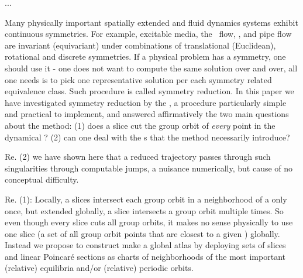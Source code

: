

\ifboyscout
	...
\fi

Many physically important spatially extended and fluid dynamics systems exhibit continuous
symmetries. For example,  excitable
media, the \KS\
flow, {\pCf}, and
pipe flow\rf{Wk04,Kerswell05} are invariant (equivariant) under
combinations of translational (Euclidean), rotational and
discrete symmetries.
If a physical problem has a symmetry, one should use it - one does not
want to compute the same solution over and over, all one needs is to
pick one representative solution per each symmetry related equivalence
class. Such procedure is called symmetry reduction.  In this
paper we have investigated symmetry reduction by the \mslices,
a procedure particularly simple and practical to implement, and
answered affirmatively the two main questions about the method:
(1) does a slice cut the group orbit of \emph{every} point in the dynamical \statesp?
(2) can one deal with the {\sset s} that the method necessarily
introduce?

Re. (2) we have shown here that a reduced trajectory
passes through such singularities through computable jumps,
a nuisance numerically, but cause of no conceptual difficulty.

Re. (1): Locally, a slices intersect each group orbit in a neighborhood of a
{\template} only once,
but extended globally, a slice intersects a group orbit multiple times.
So even though every slice cuts all group orbits, it makes no sense
physically to use one slice (a set of all group orbit points that are
closest to a given {\template}) globally. Instead we propose to
construct make a global atlas by
deploying sets of slices and linear Poincar\'e sections as charts of
neighborhoods of the most important (relative) equilibria and/or
(relative) periodic orbits.

